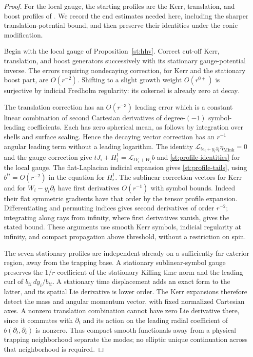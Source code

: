 \begin{proof}
For the local gauge, the starting profiles are the Kerr, translation,
and boost profiles of \cite[Lemmas~6.1--6.3, Proposition~6.5,
and~(6.6)]{HHV2025}.  We record the end estimates needed here, including
the sharper translation-potential bound, and then preserve their
identities under the conic modification.

Begin with the local gauge of Proposition~\ref{st:hhv}.
Correct cut-off Kerr, translation, and boost generators
successively with its stationary gauge-potential inverse.
The errors requiring nondecaying correction, for Kerr and the
stationary boost part, are $O(r^{-2})$.  Shifting to a slight
growth weight $O(r^{0+})$ is surjective by indicial Fredholm
regularity: its cokernel is already zero at decay.

The translation correction has an $O(r^{-3})$ leading error
which is a constant linear combination of second Cartesian
derivatives of degree-$(-1)$ symbol-leading coefficients.
Each has zero spherical mean, as follows by integration over
shells and surface scaling.  Hence the decaying vector correction
has an $r^{-1}$ angular leading term without a leading logarithm.
The identity
$\mathcal L_{te_i+y_i\partial_t}\eta_{\mathrm{Mink}}=0$
and the gauge correction give
$tJ_i+H_i^1=\mathcal L_{tV_i+W_i}b$ and
\eqref{st:profile-identities} for the local gauge.
The flat-Laplacian indicial expansion gives
\eqref{st:profile-tails}, using $b^{ti}=O(r^{-2})$ in the
equation for $H_i^1$.
The sublinear correction vectors for Kerr and for
$W_i-y_i\partial_t$ have first derivatives $O(r^{-1})$
with symbol bounds.  Indeed their flat symmetric gradients
have that order by the tensor profile expansion.  Differentiating
and permuting indices gives second derivatives of order $r^{-2}$;
integrating along rays from infinity, where first derivatives
vanish, gives the stated bound.  These arguments use smooth Kerr
symbols, indicial regularity at infinity, and compact propagation
above threshold, without a restriction on spin.

The seven stationary profiles are independent already on a
sufficiently far exterior region, away from the trapping base.
A stationary sublinear-symbol gauge preserves the $1/r$
coefficient of the stationary Killing-time norm and the leading
curl of $b_{ti}\,dy_i/b_{tt}$.  A stationary time displacement
adds an exact form to the latter, and its spatial Lie derivative
is lower order.  The Kerr expansions therefore detect the mass
and angular momentum vector, with fixed normalized Cartesian
axes.  A nonzero translation combination cannot have zero Lie
derivative there, since it commutes with $\partial_t$ and its
action on the leading radial coefficient of
$b(\partial_t,\partial_t)$ is nonzero.  Thus compact smooth
functionals away from a physical trapping neighborhood separate
the modes; no elliptic unique continuation across that
neighborhood is required.


\end{proof}
